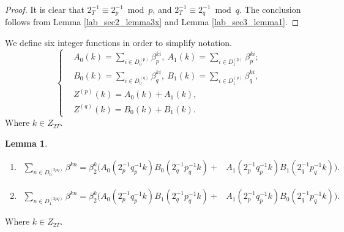 \documentclass{mcom-l}
\theoremstyle{definition}
\newtheorem{sec3lemma5}[sec3lemma1]{Lemma}
\numberwithin{equation}{section}
\begin{document}
          \begin{proof}
          It is clear that $ 2_{T}^{-1}\equiv 2_{p}^{-1} \bmod p$, and $ 2_{T}^{-1}\equiv 2_{q}^{-1} \bmod q$. The conclusion follows from Lemma \ref{lab_sec2_lemma3x} and Lemma \ref{lab_sec3_lemma1}.
          \end{proof}
          
           We define six integer functions in order to simplify notation.
              \begin{equation}\label{sec3_eq_parameters}
              \begin{cases}
              &A_{0}(k)= \sum_{i\in D_{0}^{(p)}}\beta^{ki}_{p},
              \ A_{1}(k)= \sum_{i\in D_{1}^{(p)}}\beta^{ki}_{p};\\
              &B_{0}(k)= \sum_{i\in D_{0}^{(q)}}\beta^{ki}_{q},
              \ B_{1}(k)= \sum_{i\in D_{1}^{(q)}}\beta^{ki}_{q},\\
              &Z^{(p)}(k)=A_{0}(k)+A_{1}(k),\\
              &Z^{(q)}(k)=B_{0}(k)+B_{1}(k).
              \end{cases}
              \end{equation}
              Where $ k\in Z_{2T} $.
              \begin{sec3lemma5}\label{lab_sec3_lemma5}
              \begin{enumerate} \item
              \begin{equation*}
              \begin{split}
              \sum_{n\in D_{0}^{(2pq)}}\beta^{kn}=\beta_{2}^{k}\bigl(A_{0}(2_{p}^{-1}q_{p}^{-1}k)B_{0}(2_{q}^{-1}p_{q}^{-1}k)+
              &A_{1}(2_{p}^{-1}q_{p}^{-1}k)B_{1}(2_{q}^{-1}p_{q}^{-1}k)\bigr).
              \end{split}
              \end{equation*}
              \item
              \begin{equation*}
              \begin{split}
              \sum_{n\in D_{1}^{(2pq)}}\beta^{kn}=\beta_{2}^{k}\bigl(A_{0}(2_{p}^{-1}q_{p}^{-1}k)B_{1}(2_{q}^{-1}p_{q}^{-1}k)+
              &A_{1}(2_{p}^{-1}q_{p}^{-1}k)B_{0}(2_{q}^{-1}p_{q}^{-1}k)\bigr).
              \end{split}
              \end{equation*}
              \end{enumerate}
              Where $ k\in Z_{2T} $.
              \end{sec3lemma5}
\end{document}
